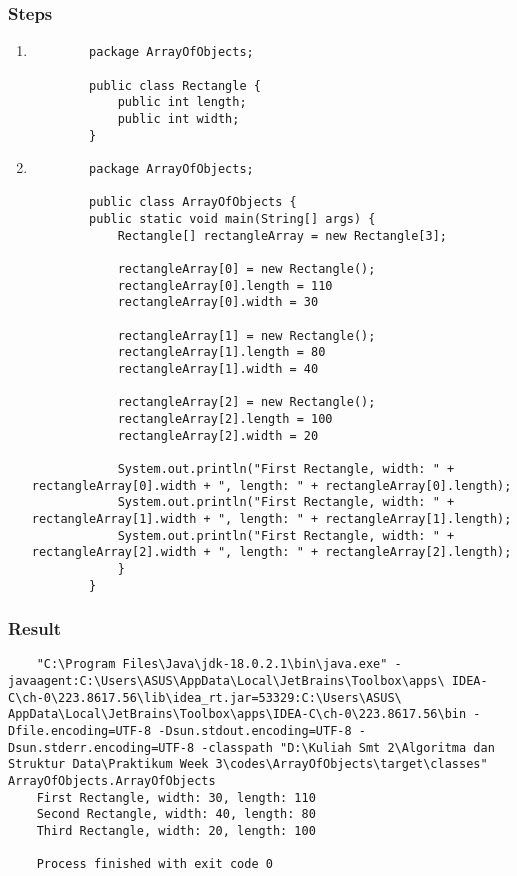 \documentclass[12pt,titlepage]{article}
\begin{document}
\subsubsection{Steps}
\begin{enumerate}
    \item \begin{verbatim}
        package ArrayOfObjects;

        public class Rectangle {
            public int length;
            public int width;
        }
    \end{verbatim}
    \item \begin{verbatim}
        package ArrayOfObjects;

        public class ArrayOfObjects {
        public static void main(String[] args) {
            Rectangle[] rectangleArray = new Rectangle[3];

            rectangleArray[0] = new Rectangle();
            rectangleArray[0].length = 110
            rectangleArray[0].width = 30

            rectangleArray[1] = new Rectangle();
            rectangleArray[1].length = 80
            rectangleArray[1].width = 40

            rectangleArray[2] = new Rectangle();
            rectangleArray[2].length = 100
            rectangleArray[2].width = 20

            System.out.println("First Rectangle, width: " + rectangleArray[0].width + ", length: " + rectangleArray[0].length);
            System.out.println("First Rectangle, width: " + rectangleArray[1].width + ", length: " + rectangleArray[1].length);
            System.out.println("First Rectangle, width: " + rectangleArray[2].width + ", length: " + rectangleArray[2].length);
            }
        }
    \end{verbatim}
\end{enumerate}

\subsubsection{Result}

\begin{verbatim}
    "C:\Program Files\Java\jdk-18.0.2.1\bin\java.exe" - javaagent:C:\Users\ASUS\AppData\Local\JetBrains\Toolbox\apps\ IDEA-C\ch-0\223.8617.56\lib\idea_rt.jar=53329:C:\Users\ASUS\ AppData\Local\JetBrains\Toolbox\apps\IDEA-C\ch-0\223.8617.56\bin -Dfile.encoding=UTF-8 -Dsun.stdout.encoding=UTF-8 -Dsun.stderr.encoding=UTF-8 -classpath "D:\Kuliah Smt 2\Algoritma dan Struktur Data\Praktikum Week 3\codes\ArrayOfObjects\target\classes" ArrayOfObjects.ArrayOfObjects
    First Rectangle, width: 30, length: 110
    Second Rectangle, width: 40, length: 80
    Third Rectangle, width: 20, length: 100

    Process finished with exit code 0

\end{verbatim}
\end{document}
